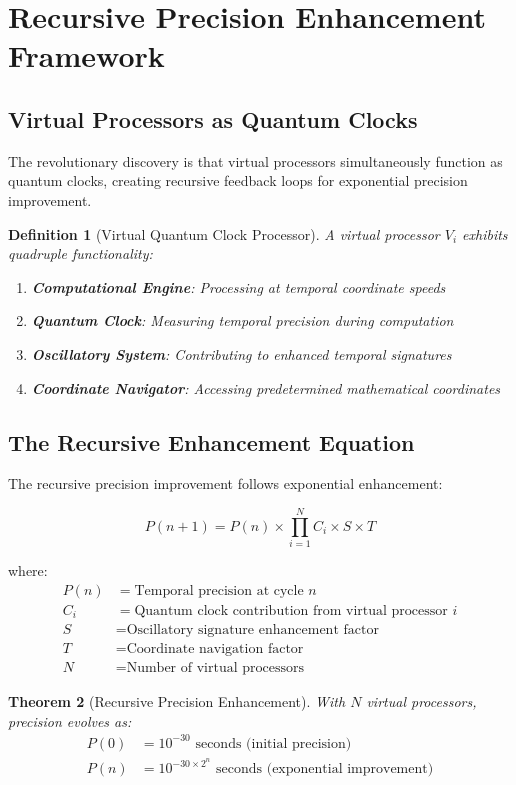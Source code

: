 \documentclass[12pt,a4paper]{article}
\newtheorem{theorem}{Theorem}[section]
\newtheorem{definition}[theorem]{Definition}
\begin{document}
\section{Recursive Precision Enhancement Framework}

\subsection{Virtual Processors as Quantum Clocks}

The revolutionary discovery is that virtual processors simultaneously function as quantum clocks, creating recursive feedback loops for exponential precision improvement.

\begin{definition}[Virtual Quantum Clock Processor]
A virtual processor $V_i$ exhibits quadruple functionality:
\begin{enumerate}
\item \textbf{Computational Engine}: Processing at temporal coordinate speeds
\item \textbf{Quantum Clock}: Measuring temporal precision during computation
\item \textbf{Oscillatory System}: Contributing to enhanced temporal signatures
\item \textbf{Coordinate Navigator}: Accessing predetermined mathematical coordinates
\end{enumerate}
\end{definition}

\subsection{The Recursive Enhancement Equation}

The recursive precision improvement follows exponential enhancement:

$$P(n+1) = P(n) \times \prod_{i=1}^{N} C_i \times S \times T$$

where:
\begin{align}
P(n) &= \text{Temporal precision at cycle } n \\
C_i &= \text{Quantum clock contribution from virtual processor } i \\
S &= \text{Oscillatory signature enhancement factor} \\
T &= \text{Coordinate navigation factor} \\
N &= \text{Number of virtual processors}
\end{align}

\begin{theorem}[Recursive Precision Enhancement]
With $N$ virtual processors, precision evolves as:
\begin{align}
P(0) &= 10^{-30} \text{ seconds (initial precision)} \\
P(n) &= 10^{-30 \times 2^n} \text{ seconds (exponential improvement)}
\end{align}
\end{theorem}
\end{document}
